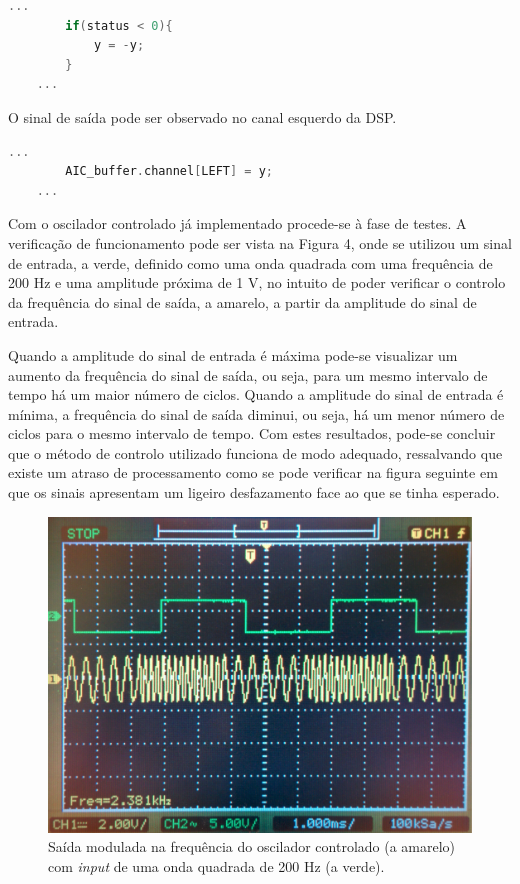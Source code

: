 \documentclass[11pt]{article}
\numberwithin{equation}{section}
\begin{document}
\begin{lstlisting}[language=C]
	...
		if(status < 0){
			y = -y;
		}
	...
\end{lstlisting}

O sinal de saída pode ser observado no canal esquerdo da DSP.

\begin{lstlisting}[language=C]
	...
		AIC_buffer.channel[LEFT] = y;
	...
\end{lstlisting}

Com o oscilador controlado já implementado procede-se à fase de testes. A verificação de funcionamento pode ser vista na Figura 4, onde se utilizou um sinal de entrada, a verde, definido como uma onda quadrada com uma frequência de 200 Hz e uma amplitude próxima de 1 V, no intuito de poder verificar o controlo da frequência do sinal de saída, a amarelo, a partir da amplitude do sinal de entrada. 

Quando a amplitude do sinal de entrada é máxima pode-se visualizar um aumento da frequência do sinal de saída, ou seja, para um mesmo intervalo de tempo há um maior número de ciclos. Quando a amplitude do sinal de entrada é mínima, a frequência do sinal de saída diminui, ou seja, há um menor número de ciclos para o mesmo intervalo de tempo. Com estes resultados, pode-se concluir que o método de controlo utilizado funciona de modo adequado, ressalvando que existe um atraso de processamento como se pode verificar na figura seguinte em que os sinais apresentam um ligeiro desfazamento face ao que se tinha esperado.


\begin{figure}[H]
	\centering
	\includegraphics[keepaspectratio=true, scale=0.10]{exps/200Hz_2_6}
	\caption{Saída modulada na frequência do oscilador controlado (a amarelo) com \textit{input} de uma onda quadrada de 200 Hz (a verde).}
	\vspace{-0.8em}
\end{figure}
\end{document}
